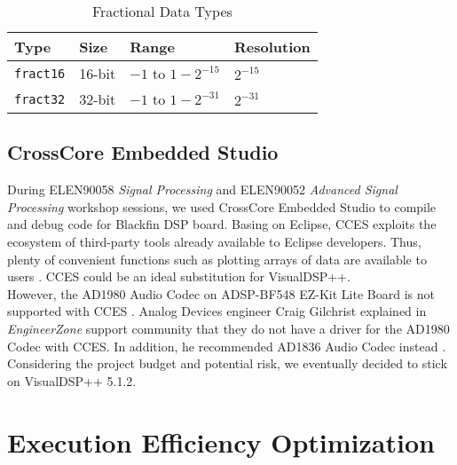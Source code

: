\begin{table}[H]
\centering
\caption{Fractional Data Types}
\label{fractional-data-types}
\begin{tabu} to \textwidth {XXXX}
\toprule
Type &Size &Range &Resolution\\
\hline
\texttt{fract16} &16-bit &$-1$ to $1 - 2^{-15}$ &$2^{-15}$\\
\hline
\texttt{fract32} &32-bit &$-1$ to $1 - 2^{-31}$ &$2^{-31}$\\
\bottomrule
\end{tabu}
\end{table}


\subsection{CrossCore Embedded Studio}

During ELEN90058 \textit{Signal Processing} and ELEN90052 \textit{Advanced Signal Processing} workshop sessions, we used CrossCore\textsuperscript{\textregistered} Embedded Studio to compile and debug code for Blackfin DSP board. Basing on Eclipse, CCES exploits the ecosystem of third-party tools already available to Eclipse developers. Thus, plenty of convenient functions such as plotting arrays of data are available to users \cite{erik-cces}\cite{cces-faq}. CCES could be an ideal substitution for VisualDSP++.\\

However, the AD1980 Audio Codec on ADSP-BF548 EZ-Kit Lite Board is not supported with CCES \cite{cces-ad1980}. Analog Devices engineer Craig Gilchrist explained in \textit{EngineerZone} support community that they do not have a driver for the AD1980 Codec with CCES. In addition, he recommended AD1836 Audio Codec instead \cite{BF548-BSP}.\\

Considering the project budget and potential risk, we eventually decided to stick on VisualDSP++ 5.1.2.


\section{Execution Efficiency Optimization}

